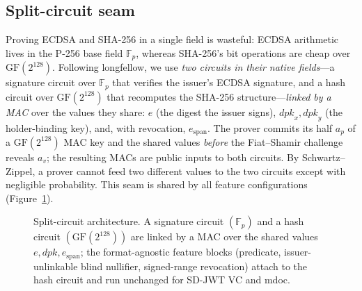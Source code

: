 \documentclass[11pt]{article}
\theoremstyle{plain}
\theoremstyle{definition}
\begin{document}
\subsection{Split-circuit seam}\label{sec:seam}
Proving ECDSA and SHA-256 in a single field is wasteful: ECDSA arithmetic lives in
the P-256 base field $\mathbb{F}_p$, whereas SHA-256's bit operations are cheap over
$\mathrm{GF}(2^{128})$. Following longfellow, we use \emph{two circuits in their native
fields}---a signature circuit over $\mathbb{F}_p$ that verifies the issuer's ECDSA
signature, and a hash circuit over $\mathrm{GF}(2^{128})$ that recomputes the SHA-256
structure---\emph{linked by a MAC} over the values they share: $e$ (the digest the
issuer signs), $\mathit{dpk}_x,\mathit{dpk}_y$ (the holder-binding key), and, with
revocation, $e_{\mathrm{span}}$. The prover commits its half $a_p$ of a
$\mathrm{GF}(2^{128})$ MAC key and the shared values \emph{before} the Fiat--Shamir
challenge reveals $a_v$; the resulting MACs are public inputs to both circuits. By
Schwartz--Zippel, a prover cannot feed two different values to the two circuits except
with negligible probability. This seam is shared by all feature configurations
(Figure~\ref{fig:seam}).

\begin{figure}[t]\centering
{}
\caption{Split-circuit architecture. A signature circuit $(\mathbb{F}_p)$ and a hash
circuit $(\mathrm{GF}(2^{128}))$ are linked by a MAC over the shared values
$e,\mathit{dpk},e_{\mathrm{span}}$; the format-agnostic feature blocks (predicate,
issuer-unlinkable blind nullifier, signed-range revocation) attach to the hash circuit
and run unchanged for SD-JWT VC and mdoc.}
\label{fig:seam}
\end{figure}
\end{document}
